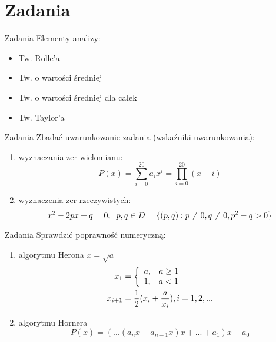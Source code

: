 \section{Zadania}
\begin{frame}{Zadania}
	Elementy analizy:
    \begin{itemize}
    	\item Tw. Rolle'a
        \item Tw. o wartości średniej
        \item Tw. o wartości średniej dla całek
        \item Tw. Taylor'a
    \end{itemize}
\end{frame}
\begin{frame}{Zadania}
	Zbadać uwarunkowanie zadania (wskaźniki uwarunkowania):
    \begin{enumerate}
    	\item wyznaczania zer wielomianu: \[
				P(x) = \sum_{i=0}^{20} a_i x^i = \prod_{i=0}^{20} (x-i)
            \]
        \item wyznaczenia zer rzeczywistych: \[
        		x^2 - 2px + q = 0, \hspace{.2cm} p, q \in D = \{ 
                	(p, q): p \neq 0, q \neq 0, p^2 - q > 0
                \}
        	\]
    \end{enumerate}
\end{frame}
\begin{frame}{Zadania}
	Sprawdzić poprawność numeryczną:
    \begin{enumerate}
    	\item algorytmu Herona $x = \sqrt{a}$
        	\begin{align*}
                x_1 &= \left\{
                    \begin{array}{ll}
                        a, \hspace{.3cm} a \ge 1 \\
                        1, \hspace{.3cm} a < 1
                    \end{array}
                \right. \\ 
                x_{i+1} &= \frac{1}{2}(x_i + \frac{a}{x_i}), i=1, 2, ...
        	\end{align*}
        \item algorytmu Hornera \[
        	P(x) = (...(a_n x + a_{n-1} x)x + ... + a_1) x + a_0
        \]
    \end{enumerate}
\end{frame}